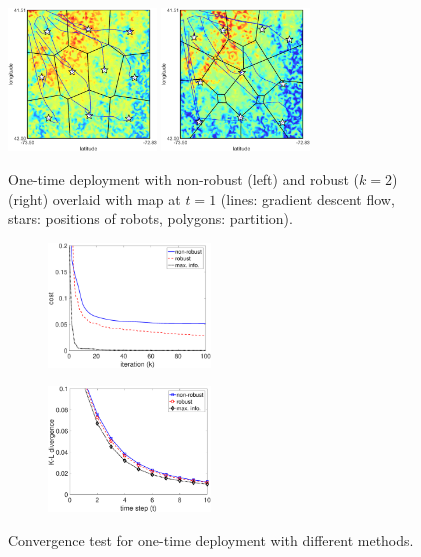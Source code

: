 \documentclass[letterpaper, 10 pt, conference]{ieeeconf}
\begin{document}
\begin{figure}
		\centering
  	\includegraphics[width=1.55in]{figure/new_path1}
  	  	\includegraphics[width=1.55in]{figure/new_path2}
	\caption{One-time deployment with non-robust (left) and robust ($k=2$) (right) overlaid with map at $t=1$ (lines: gradient descent flow, stars: positions of robots, polygons: partition).}
	\label{fig:fig2}
\end{figure}

\begin{figure}
	\centering
	\begin{subfigure}[b]{0.23\textwidth}
		\centering
	\includegraphics[width=1.7in]{figure/cost_left}
	\caption{}
	\end{subfigure}
	\begin{subfigure}[b]{0.23\textwidth}
		\centering
	\includegraphics[width=1.7in]{figure/kl_right}
	\caption{}
	\end{subfigure}
	\caption{Convergence test for one-time deployment with different methods.}
	\label{fig:fig0}
\end{figure}
\end{document}
